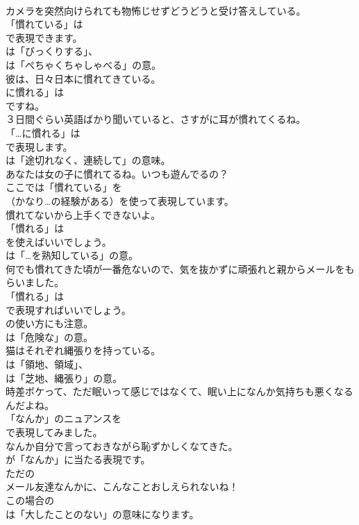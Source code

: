 \documentclass[8pt]{extreport}
\begin{document}
\begin{CJK}{UTF8}{min}
\\	カメラを突然向けられても物怖じせずどうどうと受け答えしている。 
\\	「慣れている」は
\\	で表現できます。
\\	は「びっくりする」、
\\	は「ぺちゃくちゃしゃべる」の意。	
\\	彼は、日々日本に慣れてきている。 
\\	に慣れる」は
\\	ですね。	
\\	３日間ぐらい英語ばかり聞いていると、さすがに耳が慣れてくるね。 
\\	「…に慣れる」は
\\	で表現します。
\\	は「途切れなく、連続して」の意味。	
\\	あなたは女の子に慣れてるね。いつも遊んでるの？ 
\\	ここでは「慣れている」を 
\\	（かなり…の経験がある）を使って表現しています。	
\\	慣れてないから上手くできないよ。 
\\	「慣れる」は
\\	を使えばいいでしょう。
\\	は「…を熟知している」の意。	
\\	何でも慣れてきた頃が一番危ないので、気を抜かずに頑張れと親からメールをもらいました。 
\\	「慣れる」は 
\\	で表現すればいいでしょう。
\\	の使い方にも注意。
\\	は「危険な」の意。	
\\	猫はそれぞれ縄張りを持っている。 
\\	は「領地、領域」、
\\	は「芝地、縄張り」の意。	
\\	時差ボケって、ただ眠いって感じではなくて、眠い上になんか気持ちも悪くなるんだよね。 
\\	「なんか」のニュアンスを
\\	で表現してみました。	
\\	なんか自分で言っておきながら恥ずかしくなてきた。 
\\	が「なんか」に当たる表現です。	
\\	ただの
\\	メール友達なんかに、こんなことおしえられないね！ 
\\	この場合の
\\	は「大したことのない」の意味になります。	

\end{CJK}
\end{document}
